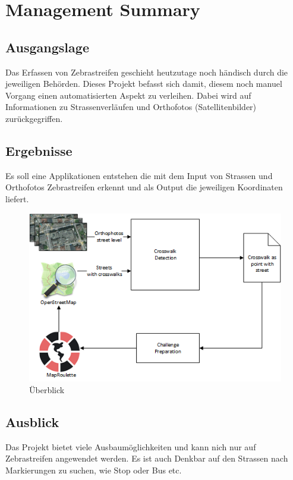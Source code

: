 \chapter*{Management Summary}
\section*{Ausgangslage}
Das Erfassen von Zebrastreifen geschieht heutzutage noch händisch durch die jeweiligen Behörden.
Dieses Projekt befasst sich damit, diesem noch manuel Vorgang einen automatisierten Aspekt zu verleihen.
Dabei wird auf Informationen zu Strassenverläufen und Orthofotos (Satellitenbilder) zurückgegriffen. 
\section*{Ergebnisse}
Es soll eine Applikationen entstehen die mit dem Input von Strassen und Orthofotos Zebrastreifen erkennt und als Output die jeweiligen Koordinaten liefert.
\begin{figure}[ht]
\includegraphics[width=\textwidth]{images/management_summary_1.png}
\caption[Überblick]{Überblick}
\end{figure}
\section*{Ausblick}
Das Projekt bietet viele Ausbaumöglichkeiten und kann nich nur auf Zebrastreifen angewendet werden. Es ist auch Denkbar auf den Strassen nach Markierungen zu suchen, wie Stop oder Bus etc.